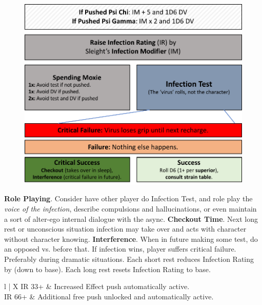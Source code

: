 \begin{figure}[H]%
   \centering
   \includegraphics[scale=0.615]{gfx/psi-infection}%
\end{figure}%

\bigskip

\begin{itemize}
    \itembox \textbf{Role Playing}. Consider have other player do Infection Test, and role play the \textit{voice of the infection}, describe compulsions and hallucinations, or even maintain a sort of alter-ego internal dialogue with the async.
    \itembox \textbf{Checkout Time}. Next long rest or unconscious situation infection may take over and acts with character without character knowing.
    \itembox \textbf{Interference}. When in future making some test, do an opposed  vs.  before that. If infection wins, player suffers critical failure. Preferably during dramatic situations.
    \itembox Each short rest reduces Infection Rating by  (down to base). Each long rest resets Infection Rating to base.
\end{itemize}

\bigskip

\begin{eptable}{ l | X }
   IR 33+ & Increased Effect push automatically active.\\
   IR 66+ & Additional free push unlocked and automatically active.\\
\end{eptable}


